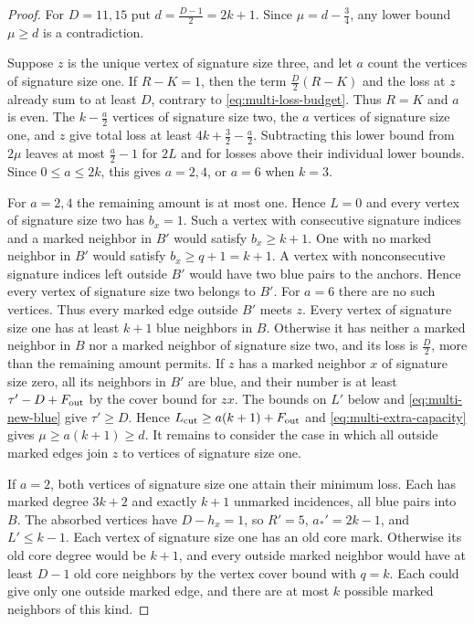 \documentclass[preprint,11pt,numbers]{elsarticle-arxiv}
\numberwithin{equation}{section}
\theoremstyle{definition}
\begin{document}
\begin{proof}
For $D=11,15$ put $d=\frac{D-1}{2}=2k+1$. Since
$\mu=d-\frac{3}{4}$, any lower bound $\mu\ge d$ is a contradiction.


Suppose $z$ is the unique vertex of signature size three, and let
$a$ count the vertices of signature size one. If $R-K=1$, then
the term $\frac{D}{2}(R-K)$ and the loss at $z$ already sum to
at least $D$, contrary to \eqref{eq:multi-loss-budget}. Thus
$R=K$ and $a$ is even. The $k-\frac{a}{2}$ vertices of signature
size two, the $a$ vertices of signature size one, and $z$ give
total loss at least $4k+\frac{3}{2}-\frac{a}{2}$. Subtracting this
lower bound from $2\mu$ leaves at most $\frac{a}{2}-1$ for $2L$
and for losses above their individual lower bounds. Since
$0\le a\le2k$, this gives $a=2,4$, or $a=6$ when $k=3$.

For $a=2,4$ the remaining amount is at most one. Hence $L=0$
and every vertex of signature size two has $b_x=1$. Such a vertex
with consecutive signature indices and a marked neighbor in $B'$
would satisfy $b_x\ge k+1$. One with no marked neighbor in $B'$
would satisfy $b_x\ge q+1=k+1$. A vertex with nonconsecutive
signature indices left outside $B'$ would have two blue pairs to
the anchors. Hence every vertex of signature size two belongs to
$B'$. For $a=6$ there are no such vertices. Thus every marked
edge outside $B'$ meets $z$. Every vertex of signature size one
has at least $k+1$ blue neighbors in $B$. Otherwise it has
neither a marked neighbor in $B$ nor a marked neighbor of
signature size two, and its loss is $\frac{D}{2}$, more than
the remaining amount permits. If $z$ has a marked neighbor $x$
of signature size zero, all its neighbors in $B'$ are blue, and
their number is at least $\tau'-D+F_{\rm out}$ by the cover
bound for $zx$. The bounds on $L'$ below and
\eqref{eq:multi-new-blue} give $\tau'\ge D$. Hence
$L_{\rm cut}\ge a(k+1)+F_{\rm out}$ and
\eqref{eq:multi-extra-capacity} gives $\mu\ge a(k+1)\ge d$.
It remains to consider the case in which all outside marked
edges join $z$ to vertices of signature size one.

If $a=2$, both vertices of signature size one attain their
minimum loss. Each has marked degree $3k+2$ and exactly $k+1$
unmarked incidences, all blue pairs into $B$. The absorbed
vertices have $D-h_x=1$, so $R'=5$, $a_*'=2k-1$, and
$L'\le k-1$. Each vertex of signature size one has an old core
mark. Otherwise its old core degree would be $k+1$, and every
outside marked neighbor would have at least $D-1$ old core
neighbors by the vertex cover bound with $q=k$. Each could give
only one outside marked edge, and there are at most $k$
possible marked neighbors of this kind.


\end{proof}
\end{document}
